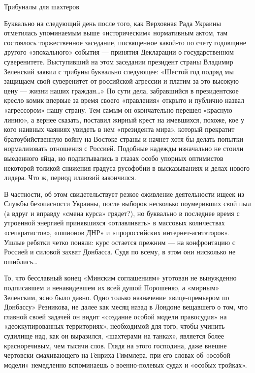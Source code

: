 \documentclass[a4paper,11pt]{extreport}
\begin{document}
Трибуналы для шахтеров

Буквально на следующий день после того, как Верховная Рада Украины отметилась
упоминаемым выше «историческим» нормативным актом, там состоялось торжественное
заседание, посвященное какой-то по счету годовщине другого «эпохального»
события --- принятия Декларации о государственном суверенитете. Выступивший на
этом заседании президент страны Владимир Зеленский заявил с трибуны буквально
следующее: «Шестой год подряд мы защищаем свой суверенитет от российской
агрессии и платим за это высокую цену --- жизни наших граждан…» По сути дела,
забравшийся в президентское кресло комик впервые за время своего «правления»
открыто и публично назвал «агрессором» нашу страну. Тем самым он окончательно
перешел «красную линию», а вернее сказать, поставил жирный крест на имевшихся,
похоже, кое у кого наивных чаяниях увидеть в нем «президента мира», который
прекратит братоубийственную войну на Востоке страны и начнет хотя бы делать
попытки нормализовать отношения с Россией. Подобные надежды изначально не
стоили выеденного яйца, но подпитывались в глазах особо упорных оптимистов
некоторой толикой снижения градуса русофобии в высказываниях и делах нового
лидера. Что ж, период иллюзий закончился.

В частности, об этом свидетельствует резкое оживление деятельности ищеек из
Службы безопасности Украины, после выборов несколько поумеривших свой пыл (а
вдруг и вправду «смена курса» грядет?), но буквально в последнее время с
утроенной энергией принявшихся «отлавливать» в массовых количествах
«сепаратистов», «шпионов ДНР» и «пророссийских интернет-агитаторов». Ушлые
ребятки четко поняли: курс остается прежним --- на конфронтацию с Россией и
силовой захват Донбасса. Судя по всему, в этом они нисколько не ошиблись…

То, что бесславный конец «Минским соглашениям» уготован не вынужденно
подписавшем и ненавидевшем их всей душой Порошенко, а «мирным» Зеленским, ясно
было давно. Одно только назначение «вице-премьером по Донбассу» Резникова, не
далее как месяц назад в Лондоне вещавшего о том, что главной своей задачей он
видит «создание особой модели правосудия» на «деоккупированных территориях»,
необходимой для того, чтобы учинить судилище над, как он выразился, «шахтерами
на танках», является более красноречивым, чем тысячи слов. Глядя на этого
господина, даже внешне чертовски смахивающего на Генриха Гиммлера, при его
словах об «особой модели» немедленно вспоминаешь о военно-полевых судах и
«особых тройках».
\end{document}
